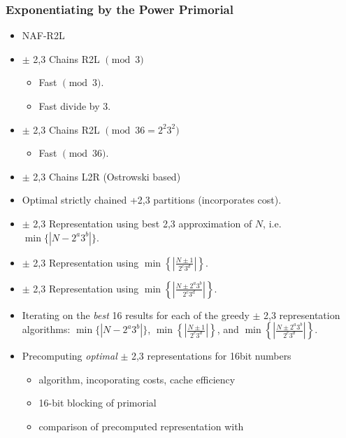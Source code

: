 \documentclass[11pt, letterpaper]{article}
\theoremstyle{definition}
\begin{document}
\subsubsection{Exponentiating by the Power Primorial}
\begin{itemize}
\item NAF-R2L
\item $\pm$ 2,3 Chains R2L $\pmod{3}$
	\begin{itemize}
	\item Fast $\pmod 3$.
	\item Fast divide by 3.
	\end{itemize}
\item $\pm$ 2,3 Chains R2L $\pmod{36=2^2 3^2}$
	\begin{itemize}
	\item Fast $\pmod{36}$.
	\end{itemize}
\item $\pm$ 2,3 Chains L2R (Ostrowski based)
\item Optimal strictly chained +2,3 partitions (incorporates cost).
\item $\pm$ 2,3 Representation using best 2,3 approximation of $N$, i.e. $\min \{|N-2^a3^b|\}$.
\item $\pm$ 2,3 Representation using $\min \left\{ \left| \frac{N \pm 1}{2^c3^d} \right| \right\}$.
\item $\pm$ 2,3 Representation using $\min \left\{ \left| \frac{N \pm 2^a3^b}{2^c3^d} \right| \right\}$.
\item Iterating on the \emph{best} 16 results for each of the greedy $\pm$ 2,3 representation algorithms: $\min \{|N-2^a3^b|\}$, $\min \left\{ \left| \frac{N \pm 1}{2^c3^d} \right| \right\}$, and $\min \left\{ \left| \frac{N \pm 2^a3^b}{2^c3^d} \right| \right\}$.
\item Precomputing \emph{optimal} $\pm$ 2,3 representations for 16bit numbers
	\begin{itemize}
	\item algorithm, incoporating costs, cache efficiency
	\item 16-bit blocking of primorial
	\item comparison of precomputed representation with 
	\end{itemize}
\end{itemize}
\end{document}
